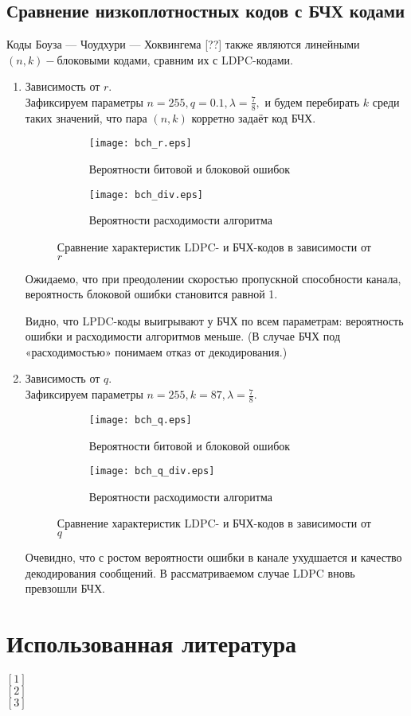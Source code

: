 \documentclass[12pt,a4paper,oneside,fleqn,leqno]{article}
\begin{document}
		\subsection{Сравнение низкоплотностных кодов с БЧХ кодами}
			Коды Боуза --- Чоудхури --- Хоквингема [??] также являются линейными $(n, k)-$блоковыми кодами, сравним их с LDPC-кодами.
			\begin{enumerate}
				\item
				Зависимость от $r$.\\
				Зафиксируем параметры $n = 255, q = 0.1, \lambda = \frac{7}{8},$ и будем перебирать $k$ среди таких значений, что пара $(n, k)$ корретно задаёт код БЧХ.
			\begin{figure}[H]
				\begin{subfigure}[b]{0.5\textwidth}
					\centering
					\texttt{[image: bch\_r.eps]}
					\caption{Вероятности битовой и блоковой ошибок}
					\label{fig:distr_c_a}
				\end{subfigure}
				\begin{subfigure}[b]{0.5\textwidth}
					\centering
					\texttt{[image: bch\_div.eps]}
					\caption{Вероятности расходимости алгоритма}
					\label{fig:distr_c_b}
				\end{subfigure}
				\captionsetup{justification=centering}
				\caption{Сравнение характеристик LDPC- и БЧХ-кодов в зависимости от $r$}
				\label{fig:distr_c_cond}
			\end{figure}
\par
			Ожидаемо, что при преодолении скоростью пропускной способности канала, вероятность блоковой ошибки становится равной 1.\par
			Видно, что LPDC-коды выигрывают у БЧХ по всем параметрам: вероятность ошибки и расходимости алгоритмов меньше. (В случае БЧХ под «расходимостью» понимаем отказ от декодирования.)
			\item
			Зависимость от $q$.\\
			Зафиксируем параметры $n = 255, k = 87, \lambda = \frac{7}{8}.$
			\begin{figure}[H]
				\begin{subfigure}[b]{0.5\textwidth}
					\centering
					\texttt{[image: bch\_q.eps]}
					\caption{Вероятности битовой и блоковой ошибок}
					\label{fig:distr_c_a}
				\end{subfigure}
				\begin{subfigure}[b]{0.5\textwidth}
					\centering
					\texttt{[image: bch\_q\_div.eps]}
					\caption{Вероятности расходимости алгоритма}
					\label{fig:distr_c_b}
				\end{subfigure}
				\captionsetup{justification=centering}
				\caption{Сравнение характеристик LDPC- и БЧХ-кодов в зависимости от $q$}
				\label{fig:distr_c_cond}
			\end{figure}
			Очевидно, что с ростом вероятности ошибки в канале ухудшается и качество декодирования сообщений. В рассматриваемом случае LDPC вновь превзошли БЧХ.
			\end{enumerate}
	\section{Использованная литература}
		$[1]$ \\
		$[2]$ \\
		$[3]$ 
\end{document}

